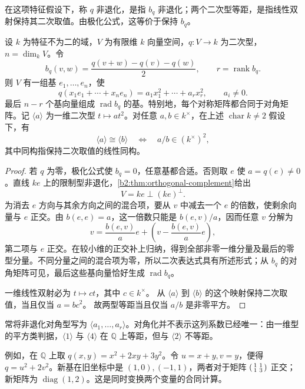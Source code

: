 在这项特征假设下，称 \(q\) 非退化，是指 \(b_q\) 非退化；两个二次型等距，是指线性双射保持其二次取值。由极化公式，这等价于保持 \(b_q\)。

\begin{theorem}[二次型的对角化]\label{b2:thm:quadratic-diagonalization}
	设 \(k\) 为特征不为二的域，\(V\) 为有限维 \(k\) 向量空间，\(q:V\to k\) 为二次型，\(n=\dim_kV\)。令
	\[
		b_q(v,w)=\frac{q(v+w)-q(v)-q(w)}2,\qquad r=\operatorname{rank}b_q.
	\]
	则 \(V\) 有一组基 \(e_1,\ldots,e_n\)，使
	\[
		q(x_1e_1+\cdots+x_ne_n)=a_1x_1^2+\cdots+a_rx_r^2, \qquad a_i\ne0.
	\]
	最后 \(n-r\) 个基向量组成 \(\operatorname{rad}b_q\) 的基。特别地，每个对称矩阵都合同于对角矩阵。记 \(\langle a\rangle\) 为一维二次型 \(t\mapsto at^2\)。对任意 \(a,b\in k^\times\)，在上述 \(\operatorname{char}k\ne2\) 假设下，有
	\[
		\langle a\rangle\cong\langle b\rangle \quad\Longleftrightarrow\quad a/b\in(k^\times)^2,
	\]
	其中同构指保持二次取值的线性同构。
\end{theorem}
\begin{proof}
	若 \(q\) 为零，极化公式使 \(b_q=0\)，任意基都合适。否则取 \(e\) 使 \(a=q(e)\ne0\)。直线 \(ke\) 上的限制型非退化，\cref{b2:thm:orthogonal-complement}给出
	\[
		V=ke\perp(ke)^\perp.
	\]
	为消去 \(e\) 方向与其余方向之间的混合项，要从 \(v\) 中减去一个 \(e\) 的倍数，使剩余向量与 \(e\) 正交。由 \(b(e,e)=a\)，这一倍数只能是 \(b(e,v)/a\)，因而任意 \(v\) 分解为
	\[
		v=\frac{b(e,v)}a e+\left(v-\frac{b(e,v)}a e\right),
	\]
	第二项与 \(e\) 正交。在较小维的正交补上归纳，得到全部非零一维分量及最后的零型分量。不同分量之间的混合项为零，所以二次表达式具有所述形式；从 \(b_q\) 的对角矩阵可见，最后这些基向量恰好生成 \(\operatorname{rad}b_q\)。

	一维线性双射必为 \(t\mapsto ct\)，其中 \(c\in k^\times\)。 从 \(\langle a\rangle\) 到 \(\langle b\rangle\) 的这个映射保持二次取值，当且仅当 \(a=bc^2\)。 故两型等距当且仅当 \(a/b\) 是非零平方。
\end{proof}

常将非退化对角型写为 \(\langle a_1,\ldots,a_r\rangle\)。对角化并不表示这列系数已经唯一：由一维型的平方类判据，\(\langle1\rangle\) 与 \(\langle4\rangle\) 在 \(\mathbb Q\) 上等距，但与 \(\langle2\rangle\) 不等距。

\ProseParagraphBreak
例如，在 \(\mathbb Q\) 上取 \(q(x,y)=x^2+2xy+3y^2\)。令 \(u=x+y,v=y\)，便得 \(q=u^2+2v^2\)。新基在旧坐标中是 \((1,0),(-1,1)\)，两者对于矩阵 \(\begin{psmallmatrix}1&1\\1&3\end{psmallmatrix}\) 正交；新矩阵为 \(\operatorname{diag}(1,2)\)。这是同时变换两个变量的合同计算。

